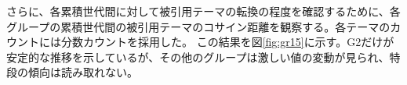 さらに、各累積世代間に対して被引用テーマの転換の程度を確認するために、各グループの累積世代間の被引用テーマのコサイン距離を観察する。各テーマのカウントには分数カウントを採用した。
この結果を図\ref{fig:gr15}に示す。G2だけが安定的な推移を示しているが、その他のグループは激しい値の変動が見られ、特段の傾向は読み取れない。

